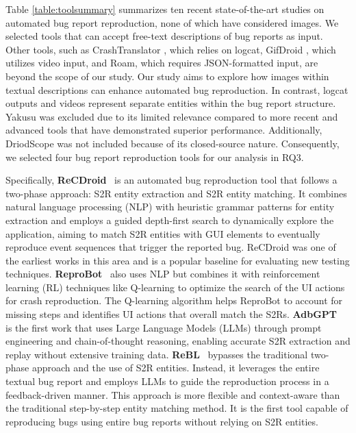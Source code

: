 Table \ref{table:toolsummary} summarizes ten recent state-of-the-art studies on automated bug report reproduction, none of which have considered images.  We selected tools that can accept free-text descriptions of bug reports as input. Other tools, such as CrashTranslator \cite{huang2024crashtranslator}, which relies on logcat, GifDroid \cite{feng2022gifdroid}, which utilizes video input, and Roam\cite{zhang2024mobile}, which requires JSON-formatted input, are beyond the scope of our study. 
Our study aims to explore how images within textual descriptions can enhance automated bug reproduction. 
In contrast, logcat outputs and videos represent separate entities within the bug report structure. 
%
Yakusu\cite{fazzini2018automatically} was excluded due to its limited relevance compared to more recent and advanced tools that have demonstrated superior performance. Additionally, DriodScope\cite{huang2023context} was not included because of its closed-source nature. Consequently, we selected four bug report reproduction tools \cite{zhao2019recdroid, zhang2023automatically, feng2024prompting, wang2024feedback} for our analysis
in RQ3. 

Specifically,
\textbf{ReCDroid}~\cite{zhao2019recdroid} is an automated bug reproduction tool that follows a two-phase approach: S2R entity extraction and S2R entity matching. It combines natural language processing (NLP) with heuristic grammar patterns for entity extraction and employs a guided depth-first search to dynamically explore the application, aiming to match S2R entities with GUI elements to eventually reproduce event sequences that trigger the reported bug. ReCDroid was one of the earliest works in this area and is a popular baseline for evaluating new testing techniques.
%
\textbf{ReproBot}~\cite{zhang2023automatically} also uses NLP but combines it with reinforcement learning (RL) techniques like Q-learning to optimize the search of the UI actions for crash reproduction. The Q-learning algorithm helps ReproBot to account for missing steps and identifies UI actions that overall match the S2Rs. 
%
\textbf{AdbGPT}~\cite{feng2024prompting} is the first work that uses Large Language Models (LLMs) through prompt engineering and chain-of-thought reasoning, enabling accurate S2R extraction and replay without extensive training data.
%
\textbf{ReBL}~\cite{wang2024feedback} bypasses the traditional two-phase approach and the use of S2R entities. Instead, it leverages the entire textual bug report and employs LLMs to guide the reproduction process in a feedback-driven manner. This approach is more flexible and context-aware than the traditional step-by-step entity matching method. It is the first tool capable of reproducing bugs using entire bug reports without relying on S2R entities. 
%

